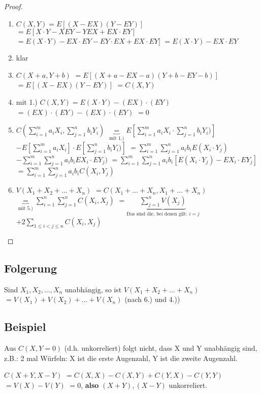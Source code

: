 \begin{proof}
\begin{enumerate}
\item $ C(X,Y) = E[(X-EX)(Y-EY)]$
$=E[X\cdot Y - X EY - YEX + EX\cdot EY]$
$=E(X\cdot Y) - EX\cdot EY - EY\cdot EX + EX\cdot EY] $
$=E(X\cdot Y) - EX \cdot EY$
\item klar
\item $ C(X+a, Y+b)$
$=E[(X+a - EX - a) (Y+b - EY - b)]$
$=E[(X - EX) (Y - EY)]$
$=C(X,Y)$ 
\item mit 1.) $C(X,Y) = E(X\cdot Y) - (EX) \cdot (EY)$ 
$=(EX) \cdot (EY) - (EX) \cdot (EY)$
$=0$
\item $C(\sum_{i=1}^{m} a_i X_i, \sum_{j=1}^{n} b_i Y_i) $
$\underbrace{=}_{\textrm{mit 1.)}} E[\sum_{i=1}^{m} a_i X_i \cdot \sum_{j=1}^{n} b_i Y_i)] $
$- E[\sum_{i=1}^{m} a_i X_i] \cdot E[\sum_{j=1}^{n} b_i Y_i)] $
$= \sum_{i=1}^{m} \sum_{j=1}^{n} a_i b_i E(X_i\cdot Y_j)$
$-\sum_{i=1}^{m} \sum_{j=1}^{n} a_i b_i EX_i \cdot EY_j)$
$=\sum_{i=1}^{m} \sum_{j=1}^{n} a_i b_i [E(X_i\cdot Y_j) - EX_i \cdot EY_j]$
$=\sum_{i=1}^{m} \sum_{j=1}^{n} a_i b_i C(X_i, Y_j)$
\item $V(X_1 + X_2 + ... + X_n)$
$=C(X_1 + ... + X_n, X_1 + ... + X_n)$
$\underbrace{=}_{\textrm{mit 5.)}} \sum_{i=1}^{n} \sum_{j=1}^{n} C(X_i, X_j)$
$=\underbrace{\sum_{j=1}^{n} V(X_j)}_{\textrm{Das sind die, bei denen gilt: } i=j} $
$+ 2 \sum_{1\leq i < j \leq n} C(X_i, X_j)$
\end{enumerate}
\end{proof}

\subsection{Folgerung}
Sind $X_1, X_2, ..., X_n$ unabhängig, so ist 
$ V(X_1 + X_2 + ... + X_n)$
$= V(X_1) + V(X_2) + ... + V(X_n)$ (nach 6.) und 4.))

\subsection{Beispiel} 
Aus $C(X, Y = 0)$ (d.h. unkorreliert) folgt nicht, dass X und Y unabhängig sind, z.B.: 
2 mal Würfeln: X ist die erste Augenzahl, Y ist die zweite Augenzahl. 

$C(X+Y, X-Y)$
$=C(X,X) - C(X,Y) + C(Y,X) - C(Y,Y)$
$=V(X) - V(Y)$
$=0$, \textbf{also} $(X+Y), (X-Y)$ unkorreliert. \\

